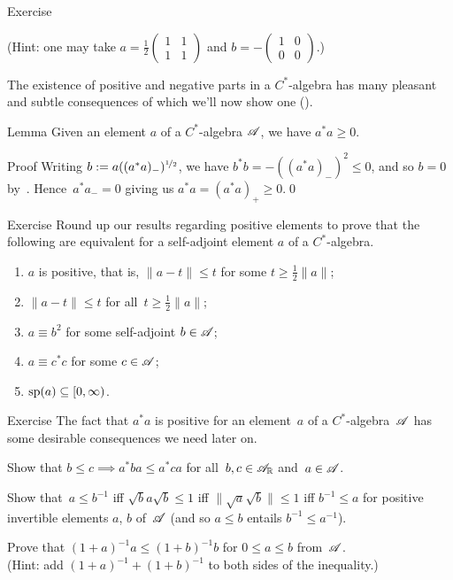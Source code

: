 \documentclass[a]{subfiles}
\begin{document}
\begin{parsec}
\begin{point}{Exercise}
\begin{enumerate}
(Hint: one may take  
$a=\frac{1}{2}\left(\begin{smallmatrix}1 & 1 \\ 1 & 1\end{smallmatrix}\right)$
and $b=-\left(\begin{smallmatrix}1 & 0 \\ 0 & 0 \end{smallmatrix}\right)$.)
\end{enumerate}
\end{point}
\begin{point}%
The existence of positive and negative parts
in a $C^*$-algebra
has many pleasant and subtle consequences
of which we'll now show one ().
\end{point}
\begin{point}{Lemma}%
Given an element $a$ of a $C^*$-algebra $\mathscr{A}$,
we have $a^*a\geq 0$.
\begin{point}{Proof}%
Writing $b:=a((a^*a)_-)^{\nicefrac{1}{2}}$,
we have $b^*b=-((a^*a)_-)^2\leq 0$,
and so $b=0$ by~.
Hence~$a^*a_-=0$ giving us $a^*a=(a^*a)_+\geq 0$.\qed
\end{point}
\end{point}
\begin{point}{Exercise}%
Round up our results regarding positive elements
to 
prove that
the following are equivalent
for a self-adjoint element $a$ of a $C^*$-algebra.
\begin{enumerate}
\item 
$a$ is positive, that is,  $\|a-t\|\leq t$
for some $t\geq \frac{1}{2}\|a\|$;
\item
$\|a-t\|\leq t$ for all~$t\geq \frac{1}{2}\|a\|$;
\item
$a\equiv b^2$ for some self-adjoint $b\in\mathscr{A}$;
\item
$a\equiv c^* c$ for some $c\in\mathscr{A}$;
\item
$\mathrm{sp}(a)\subseteq [0,\infty)$.
\end{enumerate}
\end{point}
\begin{point}{Exercise}%
The fact that $a^*a$ is positive
for an element~$a$ of a $C^*$-algebra~$\mathscr{A}$
has some desirable consequences
we need later on.
\begin{point}%
Show that $b\leq c\implies a^*ba \leq a^*ca$
for all~$b,c\in\mathscr{A}_{\mathbb{R}}$ and~$a\in\mathscr{A}$.
\end{point}
\begin{point}%
Show that~$a\leq b^{-1}$ 
iff $\sqrt{b}a\sqrt{b}\leq 1$
iff $\|\sqrt{a}\sqrt{b}\|\leq 1$
iff $b^{-1}\leq a$
for positive invertible elements $a$, $b$ of~$\mathscr{A}$
(and so $a\leq b$ entails $b^{-1}\leq a^{-1}$).
\end{point}
\begin{point}%
Prove that $(1+a)^{-1}a\leq (1+b)^{-1}b$
for $0\leq a\leq b$ from~$\mathscr{A}$.\\
(Hint: add $(1+a)^{-1} + (1+b)^{-1}$
to both sides of the inequality.)
\end{point}
\end{point}
\end{parsec}
\end{document}
